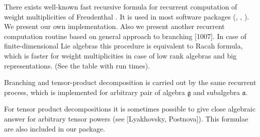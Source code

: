 \documentclass[12pt]{article}
\theoremstyle{definition}
\newcommand{\gf}{\mathfrak{g}}
\newcommand{\af}{\mathfrak{a}}
\begin{document}
There exists well-known fast recursive formula for recurrent computation of weight multiplicities of Freudenthal \cite{moody1982fast}. It is used in most software packages (\cite{vanleeuwen1994lsp}, \cite{stembridge2001computational}, \cite{fischbacher2002ilp}). We present our own implementation. Also we present another recurrent computation routine based on general approach to branching [1007]. In case of finite-dimensional Lie algebras this procedure is equivalent to Racah formula, which is faster for weight multiplicities in case of low rank algebras and big representations. (See the table with run times). 

Branching and tensor-product decomposition is carried out by the same recurrent process, which is implemented for arbitrary pair of algebra $\gf$ and subalgebra $\af$. 

For tensor product decompositions it is sometimes possible to give close algebraic answer for arbitrary tensor powers (see [Lyakhovsky, Postnova]). This formulae are also included in our package.


{}

\end{document}
